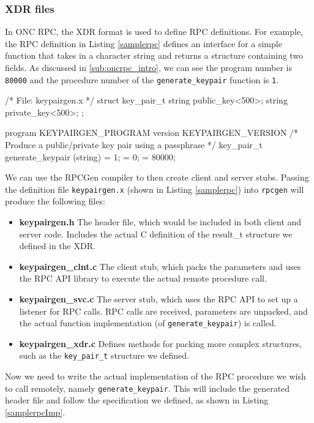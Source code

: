 \subsubsection{XDR files}
\label{sec:xdrsyntax}
In ONC RPC, the XDR format is used to define RPC definitions. For example, the RPC definition in Listing \ref{samplerpc} defines an interface for a simple function that takes in a character string  and returns a structure containing two fields. As discussed in \ref{sub:oncrpc_intro}, we can see the program number is \lstinline+80000+ and the procedure number of the \lstinline+generate_keypair+ function is \lstinline+1+.

\begin{code}
/* File: keypairgen.x */
struct key_pair_t
{
  string  public_key<500>;
  string  private_key<500>;
};

program KEYPAIRGEN_PROGRAM
{
  version KEYPAIRGEN_VERSION
  {
    /* Produce a public/private key pair using a passphrase  */
    key_pair_t generate_keypair (string) = 1;
  } = 0;
} = 80000;
\end{code}

We can use the RPCGen compiler to then create client and server stubs. Passing the definition file \verb+keypairgen.x+ (shown in Listing \ref{samplerpc}) into \lstinline+rpcgen+ will produce the following files:

\begin{itemize}
	\item \textbf{keypairgen.h} The header file, which would be included in both client and server code. Includes the actual C definition of the result\_t structure we defined in the XDR.
	\item \textbf{keypairgen\_clnt.c} The client stub, which packs the parameters and uses the RPC API library to execute the actual remote procedure call.
	\item \textbf{keypairgen\_svc.c} The server stub, which uses the RPC API to set up a listener for RPC calls. RPC calls are received, parameters are unpacked, and the actual function implementation (of \lstinline+generate_keypair+) is called.
	\item \textbf{keypairgen\_xdr.c} Defines methods for packing more complex structures, such as the \lstinline+key_pair_t+ structure we defined.
\end{itemize}

Now we need to write the actual implementation of the RPC procedure we wish to call remotely, namely \lstinline+generate_keypair+. This will include the generated header file and follow the specification we defined, as shown in Listing \ref{samplerpcImp}. \\


